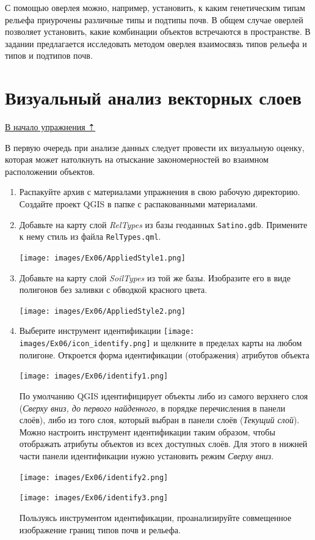 \documentclass[
  12pt,
]{book}
\begin{document}
С помощью оверлея можно, например, установить, к каким генетическим типам рельефа приурочены различные типы и подтипы почв. В общем случае оверлей позволяет установить, какие комбинации объектов встречаются в пространстве. В задании предлагается исследовать методом оверлея взаимосвязь типов рельефа и типов и подтипов почв.

\hypertarget{overlay-vectors}{%
\section{Визуальный анализ векторных слоев}\label{overlay-vectors}}

\protect\hyperlink{overlay}{В начало упражнения ⇡}

В первую очередь при анализе данных следует провести их визуальную оценку, которая может натолкнуть на отыскание закономерностей во взаимном расположении объектов.

\begin{enumerate}
\def\labelenumi{\arabic{enumi}.}
\item
  Распакуйте архив с материалами упражнения в свою рабочую директорию. Создайте проект QGIS в папке с распакованными материалами.
\item
  Добавьте на карту слой \emph{RelTypes} из базы геоданных \texttt{Satino.gdb}. Примените к нему стиль из файла \texttt{RelTypes.qml}.

  \texttt{[image: images/Ex06/AppliedStyle1.png]}
\item
  Добавьте на карту слой \emph{SoilTypes} из той же базы. Изобразите его в виде полигонов без заливки с обводкой красного цвета.

  \texttt{[image: images/Ex06/AppliedStyle2.png]}
\item
  Выберите инструмент идентификации \texttt{[image: images/Ex06/icon\_identify.png]} и щелкните в пределах карты на любом полигоне. Откроется форма идентификации (отображения) атрибутов объекта

  \texttt{[image: images/Ex06/identify1.png]}

  По умолчанию QGIS идентифицирует объекты либо из самого верхнего слоя (\emph{Сверху вниз, до первого найденного}, в порядке перечисления в панели слоёв), либо из того слоя, который выбран в панели слоёв (\emph{Текущий слой}). Можно настроить инструмент идентификации таким образом, чтобы отображать атрибуты объектов из всех доступных слоёв. Для этого в нижней части панели идентификации нужно установить режим \emph{Сверху вниз}.

  \texttt{[image: images/Ex06/identify2.png]}

  \texttt{[image: images/Ex06/identify3.png]}

  Пользуясь инструментом идентификации, проанализируйте совмещенное изображение границ типов почв и рельефа.
\end{enumerate}
\end{document}
